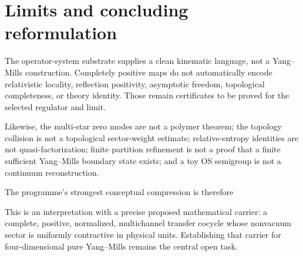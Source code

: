 \section{Limits and concluding reformulation}

The operator-system substrate supplies a clean kinematic language, not a
Yang--Mills construction.  Completely positive maps do not automatically
encode relativistic locality, reflection positivity, asymptotic freedom,
topological completeness, or theory identity.  Those remain certificates to
be proved for the selected regulator and limit.

Likewise, the multi-star zero modes are not a polymer theorem; the topology
collision is not a topological sector-weight estimate; relative-entropy
identities are not quasi-factorization; finite partition refinement is not a
proof that a finite sufficient Yang--Mills boundary state exists; and a toy
OS semigroup is not a continuum reconstruction.

The programme's strongest conceptual compression is therefore
\begin{center}
\end{center}
This is an interpretation with a precise proposed mathematical carrier: a
complete, positive, normalized, multichannel transfer cocycle whose
nonvacuum sector is uniformly contractive in physical units.  Establishing
that carrier for four-dimensional pure Yang--Mills remains the central open
task.
